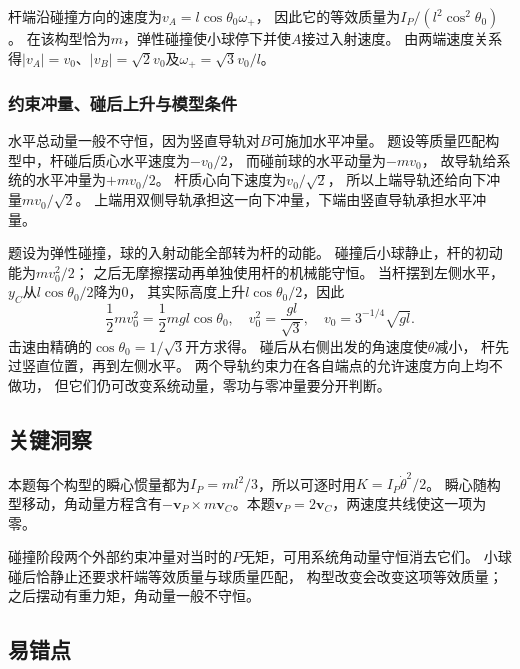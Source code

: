 \documentclass[UTF8,fontset=fandol,a4paper,11pt]{ctexart}
\begin{document}
杆端沿碰撞方向的速度为$v_A=l\cos\theta_0\omega_+$，
因此它的等效质量为$I_P/(l^2\cos^2\theta_0)$。
在该构型恰为$m$，弹性碰撞使小球停下并使$A$接过入射速度。
由两端速度关系得$|v_A|=v_0$、$|v_B|=\sqrt2v_0$及$\omega_+=\sqrt3v_0/l$。

\subsubsection*{约束冲量、碰后上升与模型条件}
水平总动量一般不守恒，因为竖直导轨对$B$可施加水平冲量。
题设等质量匹配构型中，杆碰后质心水平速度为$-v_0/2$，
而碰前球的水平动量为$-mv_0$，
故导轨给系统的水平冲量为$+mv_0/2$。
杆质心向下速度为$v_0/\sqrt2$，
所以上端导轨还给向下冲量$mv_0/\sqrt2$。
上端用双侧导轨承担这一向下冲量，下端由竖直导轨承担水平冲量。

题设为弹性碰撞，球的入射动能全部转为杆的动能。
碰撞后小球静止，杆的初动能为$mv_0^2/2$；
之后无摩擦摆动再单独使用杆的机械能守恒。
当杆摆到左侧水平，$y_C$从$l\cos\theta_0/2$降为0，
其实际高度上升$l\cos\theta_0/2$，因此
\[
\frac12mv_0^2=\frac12mgl\cos\theta_0,
\quad v_0^2=\frac{gl}{\sqrt3},\quad
v_0=3^{-1/4}\sqrt{gl}.
\]
击速由精确的$\cos\theta_0=1/\sqrt3$开方求得。
碰后从右侧出发的角速度使$\theta$减小，
杆先过竖直位置，再到左侧水平。
两个导轨约束力在各自端点的允许速度方向上均不做功，
但它们仍可改变系统动量，零功与零冲量要分开判断。




\subsection*{关键洞察}

本题每个构型的瞬心惯量都为$I_P=ml^2/3$，所以可逐时用$K=I_P\dot\theta^2/2$。
瞬心随构型移动，角动量方程含有$-\boldsymbol v_P\times m\boldsymbol v_C$。本题$\boldsymbol v_P=2\boldsymbol v_C$，两速度共线使这一项为零。

碰撞阶段两个外部约束冲量对当时的$P$无矩，可用系统角动量守恒消去它们。
小球碰后恰静止还要求杆端等效质量与球质量匹配，
构型改变会改变这项等效质量；之后摆动有重力矩，角动量一般不守恒。




\subsection*{易错点}
\end{document}
